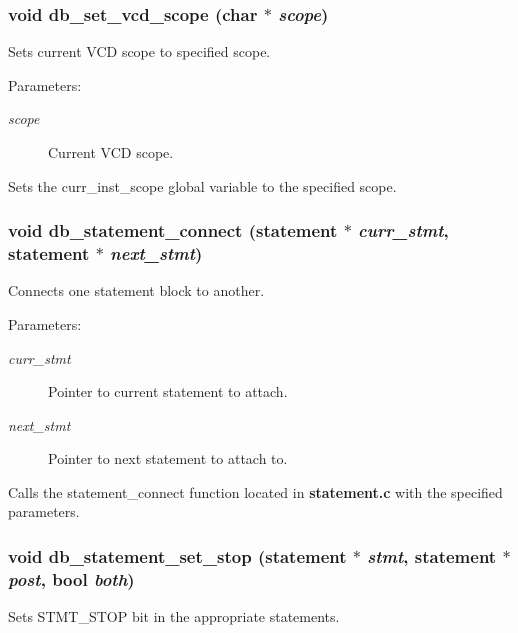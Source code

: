 \subsubsection{\setlength{\rightskip}{0pt plus 5cm}void db\_\-set\_\-vcd\_\-scope (char $\ast$ {\em scope})}\label{db_8h_a20}


Sets current VCD scope to specified scope.

\begin{Desc}
\item[Parameters:]
\begin{description}
\item[{\em scope}]Current VCD scope.\end{description}
\end{Desc}
Sets the curr\_\-inst\_\-scope global variable to the specified scope. 
\subsubsection{\setlength{\rightskip}{0pt plus 5cm}void db\_\-statement\_\-connect ({\bf statement} $\ast$ {\em curr\_\-stmt}, {\bf statement} $\ast$ {\em next\_\-stmt})}\label{db_8h_a16}


Connects one statement block to another.

\begin{Desc}
\item[Parameters:]
\begin{description}
\item[{\em curr\_\-stmt}]Pointer to current statement to attach. \item[{\em next\_\-stmt}]Pointer to next statement to attach to.\end{description}
\end{Desc}
Calls the statement\_\-connect function located in {\bf statement.c} with the specified parameters. 
\subsubsection{\setlength{\rightskip}{0pt plus 5cm}void db\_\-statement\_\-set\_\-stop ({\bf statement} $\ast$ {\em stmt}, {\bf statement} $\ast$ {\em post}, {\bf bool} {\em both})}\label{db_8h_a17}


Sets STMT\_\-STOP bit in the appropriate statements.

